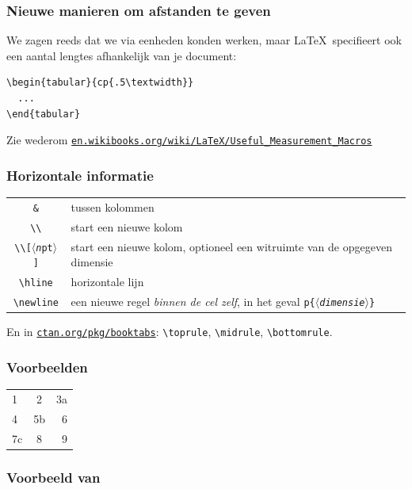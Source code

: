 \begin{frame}[fragile]
  \frametitle{Nieuwe manieren om afstanden te geven}

  We zagen reeds dat we via eenheden konden werken, maar \LaTeX\ specifieert ook een aantal lengtes afhankelijk van je document:
  \begin{verbatim}
\begin{tabular}{cp{.5\textwidth}}
  ...
\end{tabular}
  \end{verbatim}

  Zie wederom \href{http://en.wikibooks.org/wiki/LaTeX/Useful_Measurement_Macros}{\texttt{en.wikibooks.org/wiki/LaTeX/Useful\_Measurement\_Macros}}
\end{frame}

\begin{frame}[fragile]
  \frametitle{Horizontale informatie}

  \begin{tabular}{cp{}}
    \texttt{\&} & tussen kolommen \\
    \texttt{\textbackslash\textbackslash} & start een nieuwe kolom \\
    \texttt{\textbackslash\textbackslash[$\langle$\textsl{n}pt$\rangle$]} & start een nieuwe kolom, optioneel een witruimte van de opgegeven dimensie \\
    \texttt{\textbackslash hline} & horizontale lijn \\
    \texttt{\textbackslash newline} & een nieuwe regel \emph{binnen de cel zelf}, in het geval \texttt{p\{$\langle$\textsl{dimensie}$\rangle$\}}
  \end{tabular} 

  En in \href{http://ctan.org/pkg/booktabs}{\texttt{ctan.org/pkg/booktabs}}: \verb|\toprule|, \verb|\midrule|, \verb|\bottomrule|.
\end{frame}

\begin{frame}[fragile]
  \frametitle{Voorbeelden}

  \begin{LTXexample}
\begin{tabular}{lcr}
  1 & 2 & 3a \\
  4 & 5b & 6 \\
  7c & 8 & 9
\end{tabular} 
  \end{LTXexample}
\end{frame}

\begin{frame}[fragile]
  \frametitle{Voorbeeld van }

  \inputminted{tex}{table-example.tex}
\end{frame}

